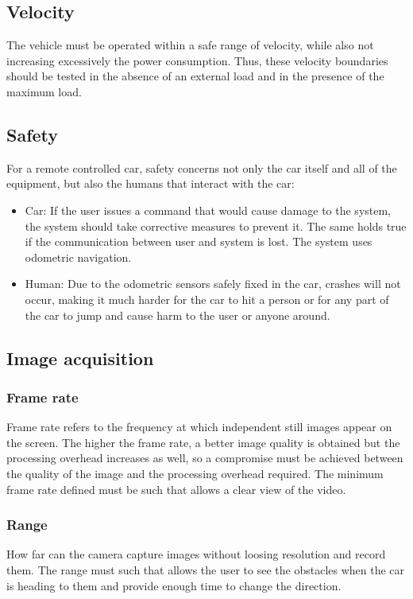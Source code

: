 \subsection{Velocity}%
\label{sec:org08718bc}
The vehicle must be operated within a safe range of velocity, while also not increasing excessively the power consumption. Thus, these velocity boundaries should be tested in the absence of an external load and in the presence of the maximum load.
\subsection{Safety}%
\label{sec:org83942c3}
For a remote controlled car, safety concerns not only the car itself and all of the equipment, but also the humans that interact with the car:
\begin{itemize}
\item Car: If the user issues a command that would cause damage to the system, the
system should take corrective measures to prevent it. The same holds true if
the communication between user and system is lost. The system uses odometric navigation.
\item Human: Due to the odometric sensors safely fixed in the car, crashes will not occur, making it much harder for the car to hit a person or for any part of the car to jump and cause harm to the user or anyone around.
\end{itemize}
\subsection{Image acquisition}%
\label{sec:orgb6a5f66}
\subsubsection{Frame rate}%
\label{sec:org5adf4ee}
Frame rate refers to the frequency at which independent still images appear on the screen. The higher the frame rate, a better image quality is obtained but the processing overhead increases as well, so a compromise must be achieved between the quality of the image and the processing overhead required. The minimum frame rate defined must be such that allows a clear view of the video.
\subsubsection{Range}%
\label{sec:orgecb044c}
How far can the camera capture images without loosing resolution and record them. The range must such that allows the user to see the obstacles when the car is heading to them and provide enough time to change the direction.
